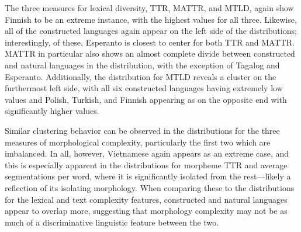 \documentclass[12pt,a4paper]{article}
\numberwithin{figure}{section}
\numberwithin{table}{section}
\numberwithin{definition}{section}
\begin{document}
The three measures for lexical diversity, TTR, MATTR, and MTLD, again show Finnish to be an extreme instance, with the highest values for all three. Likewise, all of the constructed languages again appear on the left side of the distributions; interestingly, of these, Esperanto is closest to center for both TTR and MATTR. MATTR in particular also shows an almost complete divide between constructed and natural languages in the distribution, with the exception of Tagalog and Esperanto. Additionally, the distribution for MTLD reveals a cluster on the furthermost left side, with all six constructed languages having extremely low values and Polish, Turkish, and Finnish appearing as on the opposite end with significantly higher values. 

Similar clustering behavior can be observed in the distributions for the three measures of morphological complexity, particularly the first two which are imbalanced. In all, however, Vietnamese again appears as an extreme case, and this is especially apparent in the distributions for morpheme TTR and average segmentations per word, where it is significantly isolated from the rest---likely a reflection of its isolating morphology. When comparing these to the distributions for the lexical and text complexity features, constructed and natural languages appear to overlap more, suggesting that morphology complexity may not be as much of a discriminative linguistic feature between the two.
\end{document}
